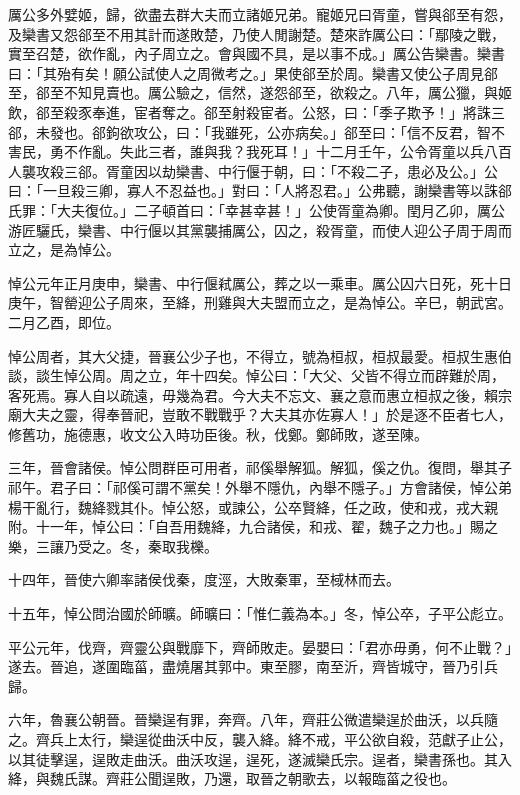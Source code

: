 \begin{pinyinscope}
厲公多外嬖姬，歸，欲盡去群大夫而立諸姬兄弟。寵姬兄曰胥童，嘗與郤至有怨，及欒書又怨郤至不用其計而遂敗楚，乃使人閒謝楚。楚來詐厲公曰：「鄢陵之戰，實至召楚，欲作亂，內子周立之。會與國不具，是以事不成。」厲公告欒書。欒書曰：「其殆有矣！願公試使人之周微考之。」果使郤至於周。欒書又使公子周見郤至，郤至不知見賣也。厲公驗之，信然，遂怨郤至，欲殺之。八年，厲公獵，與姬飲，郤至殺豕奉進，宦者奪之。郤至射殺宦者。公怒，曰：「季子欺予！」將誅三郤，未發也。郤鉤欲攻公，曰：「我雖死，公亦病矣。」郤至曰：「信不反君，智不害民，勇不作亂。失此三者，誰與我？我死耳！」十二月壬午，公令胥童以兵八百人襲攻殺三郤。胥童因以劫欒書、中行偃于朝，曰：「不殺二子，患必及公。」公曰：「一旦殺三卿，寡人不忍益也。」對曰：「人將忍君。」公弗聽，謝欒書等以誅郤氏罪：「大夫復位。」二子頓首曰：「幸甚幸甚！」公使胥童為卿。閏月乙卯，厲公游匠驪氏，欒書、中行偃以其黨襲捕厲公，囚之，殺胥童，而使人迎公子周于周而立之，是為悼公。

悼公元年正月庚申，欒書、中行偃弒厲公，葬之以一乘車。厲公囚六日死，死十日庚午，智罃迎公子周來，至絳，刑雞與大夫盟而立之，是為悼公。辛巳，朝武宮。二月乙酉，即位。

悼公周者，其大父捷，晉襄公少子也，不得立，號為桓叔，桓叔最愛。桓叔生惠伯談，談生悼公周。周之立，年十四矣。悼公曰：「大父、父皆不得立而辟難於周，客死焉。寡人自以疏遠，毋幾為君。今大夫不忘文、襄之意而惠立桓叔之後，賴宗廟大夫之靈，得奉晉祀，豈敢不戰戰乎？大夫其亦佐寡人！」於是逐不臣者七人，修舊功，施德惠，收文公入時功臣後。秋，伐鄭。鄭師敗，遂至陳。

三年，晉會諸侯。悼公問群臣可用者，祁傒舉解狐。解狐，傒之仇。復問，舉其子祁午。君子曰：「祁傒可謂不黨矣！外舉不隱仇，內舉不隱子。」方會諸侯，悼公弟楊干亂行，魏絳戮其仆。悼公怒，或諫公，公卒賢絳，任之政，使和戎，戎大親附。十一年，悼公曰：「自吾用魏絳，九合諸侯，和戎、翟，魏子之力也。」賜之樂，三讓乃受之。冬，秦取我櫟。

十四年，晉使六卿率諸侯伐秦，度涇，大敗秦軍，至棫林而去。

十五年，悼公問治國於師曠。師曠曰：「惟仁義為本。」冬，悼公卒，子平公彪立。

平公元年，伐齊，齊靈公與戰靡下，齊師敗走。晏嬰曰：「君亦毋勇，何不止戰？」遂去。晉追，遂圍臨菑，盡燒屠其郭中。東至膠，南至沂，齊皆城守，晉乃引兵歸。

六年，魯襄公朝晉。晉欒逞有罪，奔齊。八年，齊莊公微遣欒逞於曲沃，以兵隨之。齊兵上太行，欒逞從曲沃中反，襲入絳。絳不戒，平公欲自殺，范獻子止公，以其徒擊逞，逞敗走曲沃。曲沃攻逞，逞死，遂滅欒氏宗。逞者，欒書孫也。其入絳，與魏氏謀。齊莊公聞逞敗，乃還，取晉之朝歌去，以報臨菑之役也。


\end{pinyinscope}

